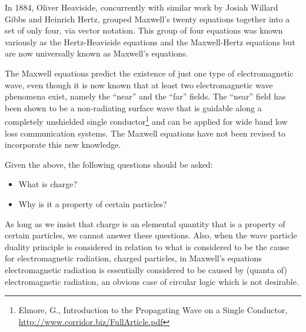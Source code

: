 \documentclass[a4paper]{article}
\newcommand\textstyleNone[1]{#1}
\begin{document}
{\color[rgb]{0.101960786,0.101960786,0.101960786}
In 1884, Oliver Heaviside, concurrently with similar work by Josiah Willard Gibbs and Heinrich Hertz, grouped Maxwell's
twenty equations together into a set of only four, via vector notation. This group of four equations was known
variously as the Hertz-Heaviside equations and the Maxwell-Hertz equations but are now universally known as Maxwell's
equations. }

{
{The Maxwell equations predict the existence of just one type of
electromagnetic wave, even though it is now known that at least two electromagnetic wave phenomena exist, namely the
``near'' and the ``far'' fields. The ``near'' field has been shown to be a non-radiating surface wave that is guidable
along a completely unshielded single conductor}\footnote{ Elmore, G., Introduction to the Propagating Wave on a Single
Conductor, \url{http://www.corridor.biz/FullArticle.pdf}\par }{ and
can be applied for wide band low loss communication
systems}\textstyleNone{{. The Maxwell equations have not been
revised to incorporate this new knowledge.  }}}

{
\textstyleNone{{Given the above, the following questions should be
asked: }}}

\begin{itemize}
\item {
\textstyleNone{{What is charge?}}}
\item {
\textstyleNone{{Why is it a property of certain particles?}}}
\end{itemize}
{
\textstyleNone{{As long as we insist that charge is an elemental
quantity that is a property of certain particles, we cannot answer these questions. Also, when the wave particle
duality principle is considered in relation to what is considered to be the cause for electromagnetic radiation,
charged particles, in Maxwell's equations electromagnetic radiation is essentially considered to be caused by (quanta
of) electromagnetic radiation, an obvious case of circular logic which is not desirable. }}}
\end{document}
